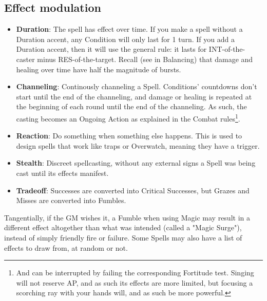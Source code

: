 \subsection{Effect modulation}

\begin{itemize}
    \item \textbf{Duration}: The spell has effect over time. If you make a spell without a Duration accent, any Condition will only last for 1 turn. If you add a Duration accent, then it will use the general rule: it  lasts for INT-of-the-caster minus RES-of-the-target. Recall (see in Balancing) that damage and healing over time have half the magnitude of bursts.
    \item \textbf{Channeling}: Continously channeling a Spell. Conditions' countdowns don't start until the end of the channeling, and damage or healing is repeated at the beginning of each round until the end of the channeling. As such, the casting becomes an Ongoing Action as explained in the Combat rules\footnote{And can be interrupted by failing the corresponding Fortitude test. Singing will not reserve AP, and as such its effects are more limited, but focusing a scorching ray with your hands will, and as such be more powerful.}.
    \item \textbf{Reaction}: Do something when something else happens. This is used to design spells that work like traps or Overwatch, meaning they have a trigger.
    \item \textbf{Stealth}: Discreet spellcasting, without any external signs a Spell was being cast until its effects manifest.
    \item \textbf{Tradeoff}: Successes are converted into Critical Successes, but Grazes and Misses are converted into Fumbles.    
\end{itemize}

Tangentially, if the GM wishes it, a Fumble when using Magic may result in a different effect altogether than what was intended (called a "Magic Surge"), instead of simply friendly fire or failure. Some Spells may also have a list of effects to draw from, at random or not.